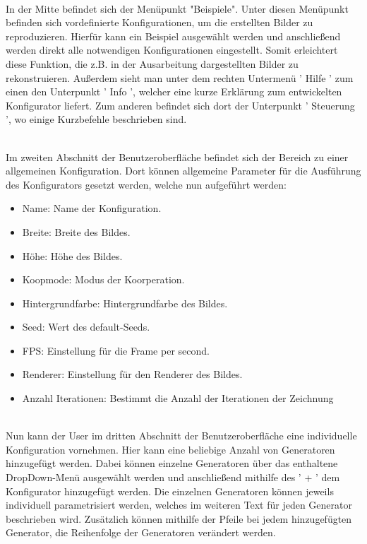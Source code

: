 \documentclass[../mciAusarbeitung.tex]{subfiles}
\begin{document}
        $~$ \\In der Mitte befindet sich der Menüpunkt "Beispiele". Unter diesen Menüpunkt befinden sich vordefinierte Konfigurationen, um die erstellten Bilder zu reproduzieren. Hierfür kann ein Beispiel ausgewählt werden und anschließend werden direkt alle notwendigen Konfigurationen eingestellt. Somit erleichtert diese Funktion, die z.B. in der Ausarbeitung dargestellten Bilder zu rekonstruieren.
        Außerdem sieht man unter dem rechten Untermenü ' Hilfe ' zum einen den Unterpunkt ' Info ', welcher eine kurze Erklärung zum entwickelten Konfigurator liefert. Zum anderen befindet sich dort der Unterpunkt ' Steuerung ', wo einige Kurzbefehle beschrieben sind.
        
        $~$ \\Im zweiten Abschnitt der Benutzeroberfläche befindet sich der Bereich zu einer allgemeinen Konfiguration. Dort können allgemeine Parameter für die Ausführung des Konfigurators gesetzt werden, welche nun aufgeführt werden:
        \begin{itemize}
            \item Name: Name der Konfiguration.
            \item Breite: Breite des Bildes.
            \item Höhe: Höhe des Bildes.
            \item Koopmode: Modus der Koorperation.
            \item Hintergrundfarbe: Hintergrundfarbe des Bildes.
            \item Seed: Wert des default-Seeds.
            \item FPS: Einstellung für die Frame per second.
            \item Renderer: Einstellung für den Renderer des Bildes.
            \item Anzahl Iterationen: Bestimmt die Anzahl der Iterationen der Zeichnung
        \end{itemize}
        
        $~$ \\Nun kann der User im dritten Abschnitt der Benutzeroberfläche eine individuelle Konfiguration vornehmen. Hier kann eine beliebige Anzahl von Generatoren hinzugefügt werden. Dabei können einzelne Generatoren über das enthaltene DropDown-Menü ausgewählt werden und anschließend mithilfe des ' + ' dem Konfigurator hinzugefügt werden. Die einzelnen Generatoren können jeweils individuell parametrisiert werden, welches im weiteren Text für jeden Generator beschrieben wird.
        Zusätzlich können mithilfe der Pfeile bei jedem hinzugefügten Generator, die Reihenfolge der Generatoren verändert werden.
        
\end{document}
